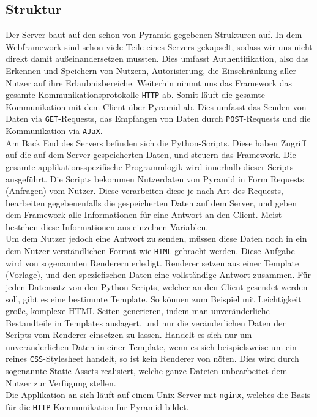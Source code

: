 \subsection{Struktur}
Der Server baut auf den schon von Pyramid gegebenen Strukturen auf. In dem Webframework
sind schon viele Teile eines Servers gekapselt, sodass wir uns nicht direkt damit
außeinandersetzen mussten. Dies umfasst Authentifikation, also das Erkennen und Speichern
von Nutzern, Autorisierung, die Einschränkung aller Nutzer auf ihre Erlaubnisbereiche.
Weiterhin nimmt uns das Framework das gesamte Kommunikationsprotokolle \texttt{HTTP} ab.
Somit läuft die gesamte Kommunikation mit dem Client über Pyramid ab. Dies umfasst das Senden
von Daten via \texttt{GET}-Requests, das Empfangen von Daten durch \texttt{POST}-Requests
und die Kommunikation via \texttt{AJaX}.\\
Am Back End des Servers befinden sich die Python-Scripts. Diese haben Zugriff auf die auf dem
Server gespeicherten Daten, und steuern das Framework. Die gesamte applikationsspezifische
Programmlogik wird innerhalb dieser Scripts ausgeführt. Die Scripts bekommen Nutzerdaten von
Pyramid in Form Requests (Anfragen) vom Nutzer.
Diese verarbeiten diese je nach Art des Requests, bearbeiten gegebenenfalls die
gespeicherten Daten auf dem Server, und geben dem Framework alle Informationen für eine Antwort
an den Client. Meist bestehen diese Informationen aus einzelnen Variablen. \\Um dem Nutzer jedoch
eine Antwort zu senden, müssen diese Daten noch in ein dem Nutzer verständlichen Format wie
\texttt{HTML} gebracht werden. Diese Aufgabe wird von sogenannten Renderern erledigt. Renderer 
setzen aus einer Template (Vorlage), und den speziefischen Daten eine vollständige Antwort
zusammen. Für jeden Datensatz von den Python-Scripts, welcher an den Client gesendet werden
soll, gibt es eine bestimmte Template. So können zum Beispiel mit Leichtigkeit große,
komplexe HTML-Seiten generieren, indem man unveränderliche Bestandteile in Templates auslagert,
und nur die veränderlichen Daten der Scripts vom Renderer einsetzen zu lassen. Handelt es
sich nur um unveränderlichen Daten in einer Template, wenn es sich beispielsweise um ein reines
\texttt{CSS}-Stylesheet handelt, so ist kein Renderer von nöten. Dies wird durch sogenannte
Static Assets realisiert, welche ganze Dateien unbearbeitet dem Nutzer zur Verfügung stellen.\\
Die Applikation an sich läuft auf einem Unix-Server mit \texttt{nginx}, welches die Basis für
die \texttt{HTTP}-Kommunikation für Pyramid bildet.

